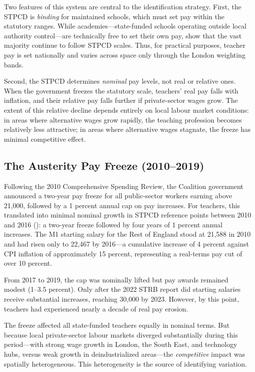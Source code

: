\documentclass[12pt]{article}
\begin{document}
Two features of this system are central to the identification strategy. First, the STPCD is \textit{binding} for maintained schools, which must set pay within the statutory ranges. While academies---state-funded schools operating outside local authority control---are technically free to set their own pay, \citet{britton2016teacher} show that the vast majority continue to follow STPCD scales. Thus, for practical purposes, teacher pay is set nationally and varies across space only through the London weighting bands.

Second, the STPCD determines \textit{nominal} pay levels, not real or relative ones. When the government freezes the statutory scale, teachers' real pay falls with inflation, and their relative pay falls further if private-sector wages grow. The extent of this relative decline depends entirely on local labour market conditions: in areas where alternative wages grow rapidly, the teaching profession becomes relatively less attractive; in areas where alternative wages stagnate, the freeze has minimal competitive effect.

\subsection{The Austerity Pay Freeze (2010--2019)}

Following the 2010 Comprehensive Spending Review, the Coalition government announced a two-year pay freeze for all public-sector workers earning above \textsterling{} 21,000, followed by a 1 percent annual cap on pay increases. For teachers, this translated into minimal nominal growth in STPCD reference points between 2010 and 2016 (): a two-year freeze followed by four years of 1 percent annual increases. The M1 starting salary for the Rest of England stood at \textsterling{} 21,588 in 2010 and had risen only to \textsterling{} 22,467 by 2016---a cumulative increase of 4 percent against CPI inflation of approximately 15 percent, representing a real-terms pay cut of over 10 percent.

From 2017 to 2019, the cap was nominally lifted but pay awards remained modest (1--3.5 percent). Only after the 2022 STRB report did starting salaries receive substantial increases, reaching \textsterling{} 30,000 by 2023. However, by this point, teachers had experienced nearly a decade of real pay erosion.

The freeze affected all state-funded teachers equally in nominal terms. But because local private-sector labour markets diverged substantially during this period---with strong wage growth in London, the South East, and technology hubs, versus weak growth in deindustrialized areas---the \textit{competitive} impact was spatially heterogeneous. This heterogeneity is the source of identifying variation.
\end{document}
